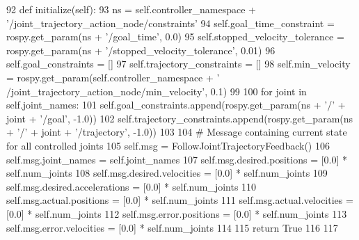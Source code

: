 \begin{DoxyCode}
92     \textcolor{keyword}{def }initialize(self):
93         ns = self.controller\_namespace + \textcolor{stringliteral}{'/joint\_trajectory\_action\_node/constraints'}
94         self.goal\_time\_constraint = rospy.get\_param(ns + \textcolor{stringliteral}{'/goal\_time'}, 0.0)
95         self.stopped\_velocity\_tolerance = rospy.get\_param(ns + \textcolor{stringliteral}{'/stopped\_velocity\_tolerance'}, 0.01)
96         self.goal\_constraints = []
97         self.trajectory\_constraints = []
98         self.min\_velocity = rospy.get\_param(self.controller\_namespace + \textcolor{stringliteral}{'
      /joint\_trajectory\_action\_node/min\_velocity'}, 0.1)
99         
100         \textcolor{keywordflow}{for} joint \textcolor{keywordflow}{in} self.joint\_names:
101             self.goal\_constraints.append(rospy.get\_param(ns + \textcolor{stringliteral}{'/'} + joint + \textcolor{stringliteral}{'/goal'}, -1.0))
102             self.trajectory\_constraints.append(rospy.get\_param(ns + \textcolor{stringliteral}{'/'} + joint + \textcolor{stringliteral}{'/trajectory'}, -1.0))
103             
104         \textcolor{comment}{# Message containing current state for all controlled joints}
105         self.msg = FollowJointTrajectoryFeedback()
106         self.msg.joint\_names = self.joint\_names
107         self.msg.desired.positions = [0.0] * self.num\_joints
108         self.msg.desired.velocities = [0.0] * self.num\_joints
109         self.msg.desired.accelerations = [0.0] * self.num\_joints
110         self.msg.actual.positions = [0.0] * self.num\_joints
111         self.msg.actual.velocities = [0.0] * self.num\_joints
112         self.msg.error.positions = [0.0] * self.num\_joints
113         self.msg.error.velocities = [0.0] * self.num\_joints
114         
115         \textcolor{keywordflow}{return} \textcolor{keyword}{True}
116 
117 
\end{DoxyCode}
\mbox{\label{classdynamixel__controllers_1_1joint__trajectory__action__controller_1_1_joint_trajectory_action_controller_a86f9e610dbac6f1de79f4ff95448daa9}} 
